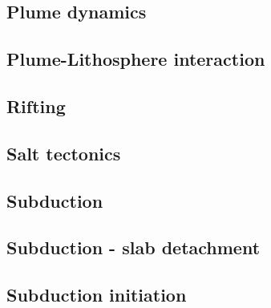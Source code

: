 \subsection*{Plume dynamics}

\cite{nasf94}
\cite{isst06}

\subsection*{Plume-Lithosphere interaction}



\subsection*{Rifting}

\cite{zieg92b}
\cite{agcz09}
\cite{aubh10}
\cite{alht11}
\cite{alht12}
\cite{alhf12}
\cite{nabu15}
\cite{olbm16}
\cite{jekm16}

\subsection*{Salt tectonics}

\cite{zaju92}
\cite{nabr93}
\cite{istt04}

\subsection*{Subduction}

\cite{jarr86}
\cite{zhgu92}
\cite{jope93}
\cite{zhgu94}
\cite{itki98}
\cite{jalo05}
\cite{artd07}
\cite{yaab07}
\cite{yaba08}
\cite{ozrs08}
\cite{yahb09}
\cite{anwb12}
\cite{jahu12}
\cite{jabi12}
\cite{jabk12}
\cite{nabg13}
\cite{ancv13}
\cite{namu13}
\cite{yosh13}
\cite{zhgt13}
\cite{jabr13}
\cite{izht13}

\subsection*{Subduction - slab detachment}

\cite{yowo95}
\cite{anbi09}

\subsection*{Subduction initiation}

